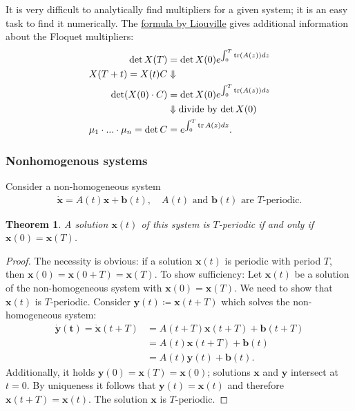 \documentclass[hidelinks,a4paper, 11pt]{article}
\theoremstyle{plain}
\newtheorem{theorem}{Theorem}
\theoremstyle{break}
\theoremstyle{plain}
\theoremstyle{definition}
\begin{document}
{It is very difficult to analytically find multipliers for a given system; it is an easy task to find it numerically. The \hyperref[formula:liouville]{formula by Liouville} gives additional information about the Floquet multipliers:
\begin{align*}
	\det X(T) &= \det X(0) e^{\int^T_0 \tr (A(z)) dz} \\
	X(T+t) = X(t)C  &\Downarrow \\
	\det (X(0) \cdot C) &= \det X(0) e^{\int^T_0 \tr (A(z)) dz} \\
	&\Downarrow \text{divide by $\det X(0)$}\\
		\mu_1\cdot ... \cdot \mu_n = \det C &= e^{\int^T_0 \tr A(z) dz}.	
\end{align*}

\subsubsection{Nonhomogenous systems}
	Consider a non-homogeneous system
\begin{align*}
\mathbf{\dot x} = A(t)\mathbf x + \mathbf b(t), \quad \text{$A(t)$ and $\mathbf b(t)$ are $T$-periodic.}
\end{align*}
\begin{theorem}\label{chapter:floquet-non-homo-periodic-solution}
A solution $\mathbf x(t)$ of this system is $T$-periodic if and only if $\mathbf x(0) = \mathbf x(T)$.
\end{theorem}
\begin{proof}
 The necessity is obvious: if a solution $\mathbf x(t)$ is periodic with period $T	$, then $\mathbf x(0) = \mathbf x(0 + T) = \mathbf x(T)$. To show sufficiency: Let $\mathbf x(t)$ be a solution of the non-homogeneous system with $\mathbf x(0) = \mathbf x(T)$. We need to show that $\mathbf x(t)$ is $T$-periodic. Consider $\mathbf y(t) \coloneqq \mathbf x(t+T)$ which solves the non-homogeneous system:
\begin{align*}
	\mathbf{\dot y(t)} = \mathbf{\dot x}(t+T) &= A(t+T)\mathbf x(t+T) + \mathbf b(t+T)\\
	&= A(t)\mathbf x(t+T) + \mathbf b(t) \\
	&= A(t)\mathbf y(t) + \mathbf b(t).
\end{align*}
Additionally, it holds $\mathbf y(0) = \mathbf x(T) = \mathbf x(0)$; solutions $\mathbf x$ and $\mathbf y$ intersect at $t=0$. By uniqueness it follows that $\mathbf y(t) = \mathbf x(t)$ and therefore $\mathbf x(t+T) = \mathbf x(t)$. The solution $\mathbf x$ is $T$-periodic.
\end{proof}

}
\end{document}

